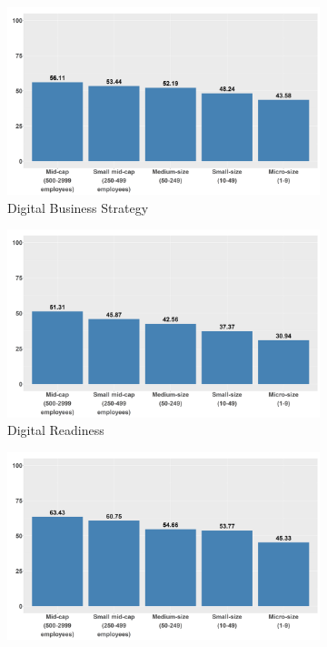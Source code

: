 \documentclass[12pt]{report}
\begin{document}
\begin{figure}[p]
    \centering
    \begin{subfigure}[b]{0.48\textwidth}
        \centering
        \includegraphics[width=\linewidth]{../Output/avg_dmascore_by_size_dig_business_strat.png}
        \caption{Digital Business Strategy}
        \label{fig:dma_size_digital_business_strategy}
    \end{subfigure}
    \hfill
    \begin{subfigure}[b]{0.48\textwidth}
        \centering
        \includegraphics[width=\linewidth]{../Output/avg_dmascore_by_size_dig_readiness.png}
        \caption{Digital Readiness}
        \label{fig:dma_size_digital_readiness}
    \end{subfigure}
    \vfill
    \begin{subfigure}[b]{0.48\textwidth}
        \centering
        \includegraphics[width=\linewidth]{../Output/avg_dmascore_by_size_hum_centr_dig.png}

\end{subfigure}
\end{figure}
\end{document}

